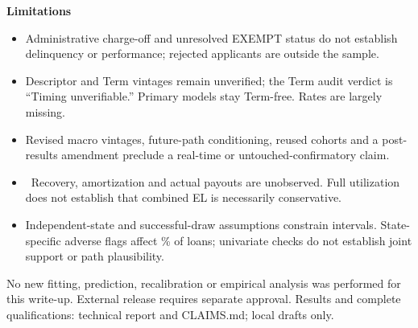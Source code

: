 \colorbox{blue!6}{\parbox{.965\linewidth}{\textbf{Limitations}\begin{itemize}\setlength\itemsep{2pt}
\item Administrative charge-off and unresolved EXEMPT status do not establish delinquency or performance; rejected applicants are outside the sample.
\item Descriptor and Term vintages remain unverified; the Term audit verdict is ``Timing unverifiable.'' Primary models stay Term-free. Rates are largely missing.
\item Revised macro vintages, future-path conditioning, reused cohorts and a post-results amendment preclude a real-time or untouched-confirmatory claim.
\item \losslabel\ Recovery, amortization and actual payouts are unobserved. Full utilization does not establish that combined EL is necessarily conservative.
\item Independent-state and successful-draw assumptions constrain intervals. State-specific adverse flags affect \SupportShare\% of loans; univariate checks do not establish joint support or path plausibility.
\end{itemize}}}

\small No new fitting, prediction, recalibration or empirical analysis was performed for this write-up. External release requires separate approval. Results and complete qualifications: technical report and CLAIMS.md; local drafts only.

